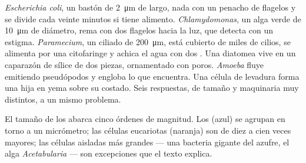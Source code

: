 \begin{example}\label{ex:b2:unicellular-diversity:drop}
\emph{Escherichia coli}, un bastón de \qty{2}{\micro m} de largo, nada
con un penacho de flagelos y se divide cada veinte minutos si tiene
alimento. \emph{Chlamydomonas}, un alga verde de \qty{10}{\micro m} de
diámetro, rema con dos flagelos hacia la luz, que detecta con un
estigma. \emph{Paramecium}, un ciliado de \qty{200}{\micro m}, está
cubierto de miles de cilios, se alimenta por una citofaringe y achica el
agua con dos . Una diatomea vive en un caparazón de
sílice de dos piezas, ornamentado con poros. \emph{Amoeba} fluye
emitiendo pseudópodos y engloba lo que encuentra. Una célula de levadura
forma una hija en yema sobre su costado. Seis respuestas, de tamaño y
maquinaria muy distintos, a un mismo problema.
\end{example}

\begin{omfigure}

{\small El tamaño de los  abarca cinco órdenes de
magnitud. Los  (azul) se agrupan en torno a un micrómetro; las
células eucariotas (naranja) son de diez a cien veces mayores; las
células aisladas más grandes --- una bacteria gigante del azufre, el alga
\emph{Acetabularia} --- son excepciones que el texto explica.}
\end{omfigure}

